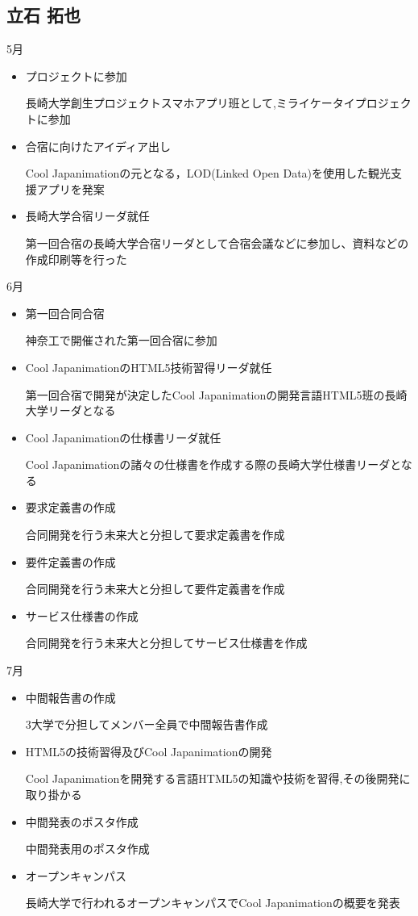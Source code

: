 \subsection{立石 拓也}
5月
\begin{itemize}
\item プロジェクトに参加
\par 長崎大学創生プロジェクトスマホアプリ班として,ミライケータイプロジェクトに参加
\item 合宿に向けたアイディア出し
\par Cool Japanimationの元となる，LOD(Linked Open Data)を使用した観光支援アプリを発案
\item 長崎大学合宿リーダ就任
\par 第一回合宿の長崎大学合宿リーダとして合宿会議などに参加し、資料などの作成印刷等を行った
\end{itemize}
6月
\begin{itemize}
\item 第一回合同合宿
\par 神奈工で開催された第一回合宿に参加
\item Cool JapanimationのHTML5技術習得リーダ就任
\par 第一回合宿で開発が決定したCool Japanimationの開発言語HTML5班の長崎大学リーダとなる
\item Cool Japanimationの仕様書リーダ就任
\par Cool Japanimationの諸々の仕様書を作成する際の長崎大学仕様書リーダとなる
\item 要求定義書の作成
\par 合同開発を行う未来大と分担して要求定義書を作成
\item 要件定義書の作成
\par 合同開発を行う未来大と分担して要件定義書を作成
\item サービス仕様書の作成
\par 合同開発を行う未来大と分担してサービス仕様書を作成
\end{itemize}
7月
\begin{itemize}
\item 中間報告書の作成
\par 3大学で分担してメンバー全員で中間報告書作成
\item HTML5の技術習得及びCool Japanimationの開発
\par Cool Japanimationを開発する言語HTML5の知識や技術を習得,その後開発に取り掛かる
\item 中間発表のポスタ作成
\par 中間発表用のポスタ作成
\item オープンキャンパス
\par 長崎大学で行われるオープンキャンパスでCool Japanimationの概要を発表
\end{itemize}
